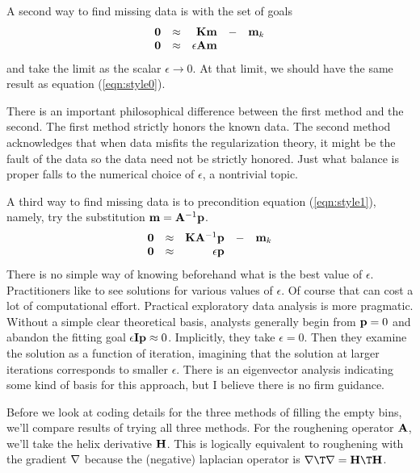 \par
A second way to find missing data is with the set of goals
\begin{equation}
\begin{array}{rrrrr}
\bold 0 & \approx &          \bold K \bold m  & - & \bold m_k \\
\bold 0 & \approx & \epsilon \bold A \bold m  &   &
\end{array}
\label{eqn:style1}
\end{equation}
and take the limit as the scalar $\epsilon \rightarrow 0$.
At that limit, we should have the same result
as equation (\ref{eqn:style0}).

\par
There is an important philosophical difference between
the first method and the second.
The first method strictly honors the known data.
The second method acknowledges that when data misfits
the regularization theory, it might be the fault of the data
so the data need not be strictly honored.
Just what balance is proper falls to the numerical choice of $\epsilon$,
a nontrivial topic.

\par
A third way to find missing data is to precondition
equation (\ref{eqn:style1}),
namely, try the substitution 
$\bold m = \bold A^{-1} \bold p $.
\begin{equation}
\begin{array}{rrrrr}
\bold 0 & \approx & \bold K \bold A^{-1} \bold p  &-& \bold m_k \\
\bold 0 & \approx & \epsilon             \bold p  & &
\end{array}
\label{eqn:style2}
\end{equation}
There is no simple way of knowing beforehand
what is the best value of $\epsilon$.
Practitioners like to see solutions for various values of $\epsilon$.
Of course that can cost a lot of computational effort.
Practical exploratory data analysis is more pragmatic.
Without a simple clear theoretical basis,
analysts generally begin from $\bold p=0$
and abandon the fitting goal $\epsilon \bold I \bold p\approx 0$.
Implicitly, they take $\epsilon=0$.
Then they examine the solution as a function of iteration,
imagining that the solution at larger iterations
corresponds to smaller $\epsilon$.
There is an eigenvector analysis
indicating some kind of basis for this approach,
but I believe there is no firm guidance.

\par
Before we look at coding details for the three methods
of filling the empty bins,
we'll compare results of trying all three methods.
For the roughening operator $\bold A$,
we'll take the helix derivative $\bold H$.
This is logically equivalent to roughening with the gradient $\bold \nabla$
because the (negative) laplacian operator is
$\bold\nabla\T\bold\nabla = \bold H\T\bold H $.

